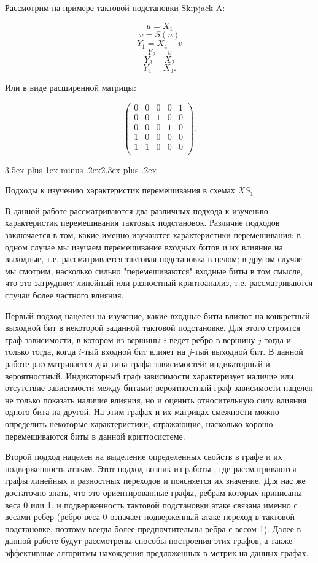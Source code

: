 \documentclass[a4paper,12pt]{report}
\makeatletter
\theoremstyle{plain} %
\theoremstyle{definition}
\theoremstyle{remark}
\renewcommand{\section}{\@startsection{section}{1}{18pt}%
{3.5ex plus 1ex minus .2ex}{2.3ex plus .2ex}%
{\normalfont\Large\bfseries\raggedright}}%
\makeatother
\begin{document}
\begin{large}
Рассмотрим на примере тактовой подстановки Skipjack A:

$$u = X_1$$
$$v = S(u)$$
$$Y_1 = X_4 + v$$
$$Y_2 = v$$
$$Y_3 = X_2$$
$$Y_4 = X_3.$$

Или в виде расширенной матрицы:

$$
\begin{pmatrix}
0 & 0 & 0 & 0 & 1\\
0 & 0 & 1 & 0 & 0\\
0 & 0 & 0 & 1 & 0\\
1 & 0 & 0 & 0 & 0\\
1    & 1    & 0 & 0    & 0\\
\end{pmatrix}.
$$

\section{Подходы к изучению характеристик перемешивания в схемах $XS_1$}

В данной работе рассматриваются два различных подхода к изучению характеристик перемешивания тактовых подстановок. Различие подходов заключается в том, какие именно изучаются характеристики перемешивания: в одном случае мы изучаем перемешивание входных битов и их влияние на выходные, т.е. рассматривается тактовая подстановка в целом; в другом случае мы смотрим, насколько сильно "перемешиваются" входные биты в том смысле, что это затрудняет линейный или разностный криптоанализ, т.е. рассматриваются случаи более частного влияния.

Первый подход нацелен на изучение, какие входные биты влияют на конкретный выходной бит в некоторой заданной тактовой подстановке. Для этого строится граф зависимости, в котором из вершины $i$ ведет ребро в вершину $j$ тогда и только тогда, когда $i$-тый входной бит влияет на $j$-тый выходной бит. В данной работе рассматривается два типа графа зависимостей: индикаторный и вероятностный. Индикаторный граф зависимости характеризует наличие или отсутствие зависимости между битами; вероятностный граф зависимости нацелен не только показать наличие влияния, но и оценить относительную силу влияния одного бита на другой. На этим графах и их матрицах смежности можно определить некоторые характеристики, отражающие, насколько хорошо перемешиваются биты в данной криптосистеме.

Второй подход нацелен на выделение определенных свойств в графе и их подверженность атакам. Этот подход возник из работы \cite{marchuk}, где рассматриваются графы линейных и разностных переходов и поясняется их значение. Для нас же достаточно знать, что это ориентированные графы, ребрам которых приписаны веса 0 или 1, и подверженность тактовой подстановки атаке связана именно с весами ребер (ребро веса 0 означает подверженный атаке переход в тактовой подстановке, поэтому всегда более предпочтительны ребра с весом 1). Далее в данной работе будут рассмотрены способы построения этих графов, а также эффективные алгоритмы нахождения предложенных в \cite{marchuk} метрик на данных графах.


\end{large}
\end{document}
